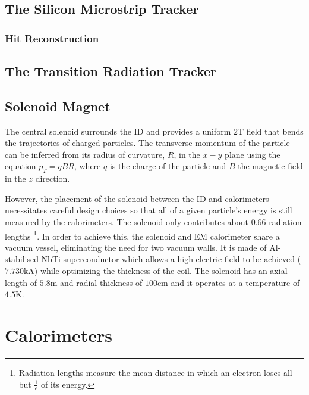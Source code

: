 \subsection{The Silicon Microstrip Tracker}
\subsubsection{Hit Reconstruction}
\subsection{The Transition Radiation Tracker}

\subsection{Solenoid Magnet}

The central solenoid surrounds the \ac{ID} and provides a uniform $2\textrm{T}$ field that bends the trajectories of charged particles. The transverse momentum of the particle can be inferred from its radius of curvature, $R$, in the $x-y$ plane using the equation $p_{T} = qBR$, where $q$ is the charge of the particle and $B$ the magnetic field in the $z$ direction.

However, the placement of the solenoid between the \ac{ID} and calorimeters necessitates careful design choices so that all of a given particle's energy is still measured by the calorimeters. The solenoid only contributes about $0.66$ radiation lengths \footnote{Radiation lengths measure the mean distance in which an electron loses all but $\frac{1}{e}$ of its energy.}. In order to achieve this, the solenoid and \ac{EM} calorimeter share a vacuum vessel, eliminating the need for two vacuum walls. It is made of Al-stabilised NbTi superconductor which allows a high electric field to be achieved ($7.730 \textrm{kA}$) while optimizing the thickness of the coil. The solenoid has an axial length of $5.8 \textrm{m}$ and radial thickness of $100 \textrm{cm}$ and it operates at a temperature of $4.5 \textrm{K}$. 


\section{Calorimeters}

